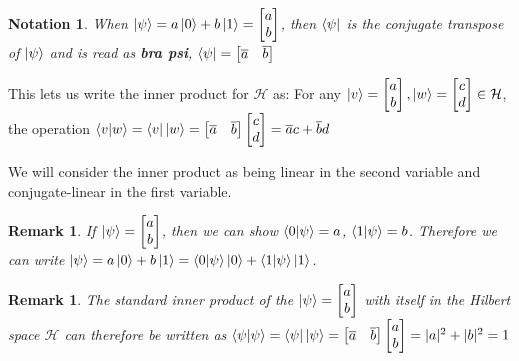 \documentclass[12pt,twoside]{report}
\theoremstyle{thmstyle}
\newtheorem{notation}[subsection]{Notation}
\newtheorem{remark}[subsection]{Remark}
\begin{document}
\begin{notation}
    When $\ket{\psi} = a \ket{0} + b \ket{1} = \begin{bmatrix} a \\ b \end{bmatrix}$, then $\bra{\psi}$ is the conjugate transpose of $\ket{\psi}$ and is read as \textbf{bra psi}, $\bra{\psi} = \begin{bmatrix} \overline{a} & \overline{b}\end{bmatrix}$
\end{notation}

This lets us write the inner product for $\mathcal{H}$ as:
For any $\ket{v} = \begin{bmatrix} a \\ b \end{bmatrix}, \ket{w} = \begin{bmatrix} c \\ d \end{bmatrix} \in \mathcal{H}$, the operation $\braket{v|w} = \bra{v}\ket{w} = \begin{bmatrix} \overline{a} & \overline{b} \end{bmatrix} \begin{bmatrix} c \\ d \end{bmatrix} = \overline{a} c + \overline{b} d $

We will consider the inner product as being linear in the second variable and conjugate-linear in the first variable.

\begin{remark}
If $\ket{\psi} = \begin{bmatrix} a \\ b \end{bmatrix}$, then we can show $\braket{0|\psi} = a$, $\braket{1|\psi} = b$.
Therefore we can write $\ket{\psi} = a \ket{0} + b \ket{1} = \braket{0|\psi} \ket{0} + \braket{1|\psi} \ket{1}$.
\end{remark}

\begin{remark}
The standard inner product of the $\ket{\psi} = \begin{bmatrix} a \\ b \end{bmatrix}$ with itself in the Hilbert space $\mathcal{H}$ can therefore be written as $\braket{\psi | \psi} = \bra{\psi}\ket{\psi} = \begin{bmatrix} \overline{a} & \overline{b}\end{bmatrix} \begin{bmatrix} a \\ b \end{bmatrix} = |a|^2 + |b|^2 = 1$
\end{remark}
\end{document}
